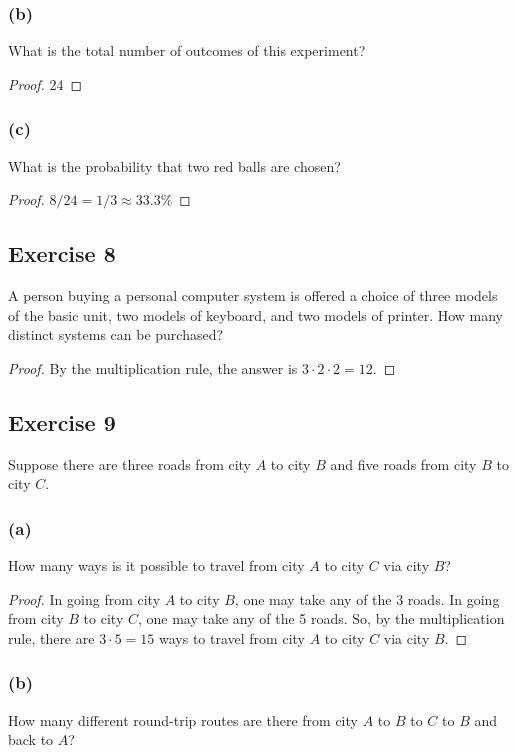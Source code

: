 \documentclass[14pt]{extarticle}
\begin{document}
\subsubsection{(b)}
What is the total number of outcomes of this experiment?

\begin{proof}
24
\end{proof}

\subsubsection{(c)}
What is the probability that two red balls are chosen?

\begin{proof}
\(8/24 = 1/3 \approx 33.3\%\)
\end{proof}

\subsection{Exercise 8}
A person buying a personal computer system is offered a choice of three models of the basic unit, two models of 
keyboard, and two models of printer. How many distinct systems can be purchased?

\begin{proof}
By the multiplication rule, the answer is \(3 \cdot 2 \cdot 2 = 12\).
\end{proof}

\subsection{Exercise 9}
Suppose there are three roads from city $A$ to city $B$ and five roads from city $B$ to city $C$. 

\subsubsection{(a)}
How many ways is it possible to travel from city $A$ to city $C$ via city $B$?

\begin{proof}
In going from city $A$ to city $B$, one may take any of the 3 roads. In going from city $B$ to city $C$, one may take 
any of the 5 roads. So, by the multiplication rule, there are \(3 \cdot 5 = 15\) ways to travel from city $A$ to city 
$C$ via city $B$.
\end{proof}

\subsubsection{(b)}
How many different round-trip routes are there from city $A$ to $B$ to $C$ to $B$ and back to $A$?
\end{document}

